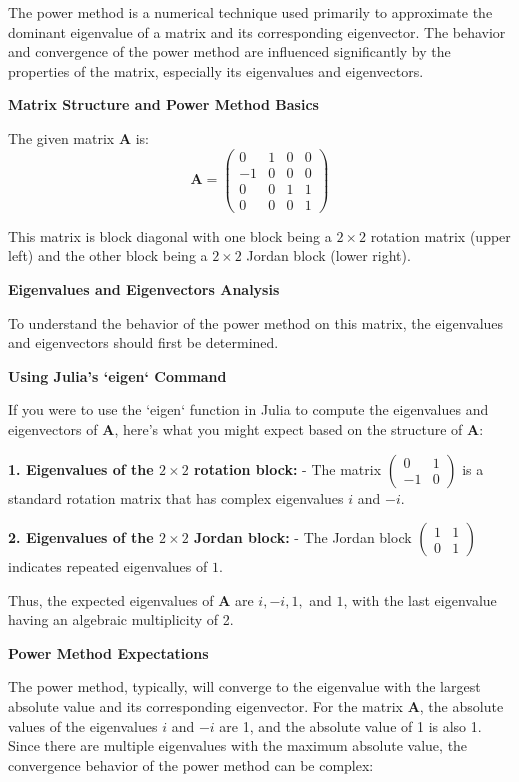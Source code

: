 \documentclass[8pt]{article}
\begin{document}
The power method is a numerical technique used primarily to approximate the dominant eigenvalue of a matrix and its corresponding eigenvector. The behavior and convergence of the power method are influenced significantly by the properties of the matrix, especially its eigenvalues and eigenvectors.

\textbf{Matrix Structure and Power Method Basics}

The given matrix \(\mathbf{A}\) is:
\[
\mathbf{A} = 
\begin{pmatrix}
0 & 1 & 0 & 0 \\
-1 & 0 & 0 & 0 \\
0 & 0 & 1 & 1 \\
0 & 0 & 0 & 1 
\end{pmatrix}
\]

This matrix is block diagonal with one block being a \(2 \times 2\) rotation matrix (upper left) and the other block being a \(2 \times 2\) Jordan block (lower right).

\textbf{Eigenvalues and Eigenvectors Analysis}

To understand the behavior of the power method on this matrix, the eigenvalues and eigenvectors should first be determined. 

\textbf{Using Julia's `eigen` Command}

If you were to use the `eigen` function in Julia to compute the eigenvalues and eigenvectors of \(\mathbf{A}\), here's what you might expect based on the structure of \(\mathbf{A}\):

\textbf{1. Eigenvalues of the \(2 \times 2\) rotation block:}
   - The matrix \(\begin{pmatrix} 0 & 1 \\ -1 & 0 \end{pmatrix}\) is a standard rotation matrix that has complex eigenvalues \(i\) and \(-i\).

\textbf{2. Eigenvalues of the \(2 \times 2\) Jordan block:}
   - The Jordan block \(\begin{pmatrix} 1 & 1 \\ 0 & 1 \end{pmatrix}\) indicates repeated eigenvalues of \(1\).

Thus, the expected eigenvalues of \(\mathbf{A}\) are \(i, -i, 1,\) and \(1\), with the last eigenvalue having an algebraic multiplicity of 2.

\textbf{Power Method Expectations}

The power method, typically, will converge to the eigenvalue with the largest absolute value and its corresponding eigenvector. For the matrix \(\mathbf{A}\), the absolute values of the eigenvalues \(i\) and \(-i\) are 1, and the absolute value of 1 is also 1. Since there are multiple eigenvalues with the maximum absolute value, the convergence behavior of the power method can be complex:
\end{document}

